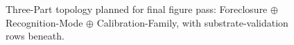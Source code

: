 \begin{figure}[tbp]
  \centering
  \caption{Three-Part topology planned for final figure pass: Foreclosure $\oplus$ Recognition-Mode $\oplus$ Calibration-Family, with substrate-validation rows beneath.}
  \label{fig:three-part-topology}
\end{figure}
